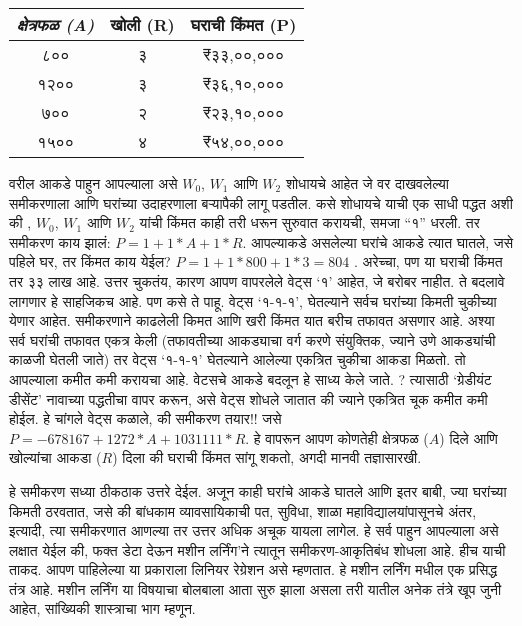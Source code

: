 \begin{table}[h!]
\centering
\begin{tabular}{|c|c|c|}
\hline
\textit{क्षेत्रफळ (A)} & \textbf{खोली (R)} & \textbf{घराची किंमत (P)} \\
\hline
८०० & ३ & ₹३३,००,००० \\
१२०० & ३ & ₹३६,१०,००० \\
७०० & २ & ₹२३,१०,००० \\
१५०० & ४ & ₹५४,००,००० \\
\hline
\end{tabular}
\end{table}


वरील आकडे पाहुन आपल्याला असे $W_0$, $W_1$ आणि $W_2$ शोधायचे आहेत जे वर दाखवलेल्या समीकरणाला आणि घरांच्या उदाहरणाला बऱ्यापैकी लागू पडतील. कसे शोधायचे याची एक साधी पद्धत अशी की , $W_0$, $W_1$ आणि $W_2$ यांची किंमत काही तरी धरून सुरुवात करायची, समजा ``१'' धरली. तर समीकरण काय झालं: $P = 1+ 1 *A + 1 *R$. आपल्याकडे असलेल्या घरांचे आकडे त्यात घातले, जसे पहिले घर, तर किंमत काय येईल? $P = 1+ 1 * 800 + 1*3 = 804$ . अरेच्चा, पण या घराची किंमत तर ३३ लाख आहे. उत्तर चुकतंय, कारण आपण वापरलेले वेट्स `१' आहेत, जे बरोबर नाहीत. ते बदलावे लागणार हे साहजिकच आहे. पण कसे ते पाहू. वेट्स `१-१-१', घेतल्याने सर्वच घरांच्या किमती चुकीच्या येणार आहेत. समीकरणाने काढलेली किमत आणि खरी किंमत यात बरीच तफावत असणार आहे. अश्या सर्व घरांची तफावत एकत्र केली (तफावतीच्या आकड्याचा वर्ग करणे संयुक्तिक, ज्याने उणे आकड्यांची काळजी घेतली जाते) तर वेट्स `१-१-१' घेतल्याने आलेल्या एकत्रित चुकीचा आकडा मिळतो. तो आपल्याला कमीत कमी करायचा आहे. वेटसचे आकडे बदलून हे साध्य केले जाते. ? त्यासाठी `ग्रेडीयंट डीसेंट' नावाच्या पद्धतीचा वापर करून, असे वेट्स शोधले जातात की ज्याने एकत्रित चूक कमीत कमी होईल. हे चांगले वेट्स कळाले, की समीकरण तयार!! जसे $P = -678167 + 1272 * A + 1031111 * R$. हे वापरून आपण कोणतेही क्षेत्रफळ ($A$) दिले आणि खोल्यांचा आकडा ($R$) दिला की  घराची किंमत सांगू शकतो, अगदी मानवी तज्ञासारखी.

हे समीकरण सध्या ठीकठाक उत्तरे देईल. अजून काही घरांचे आकडे  घातले  आणि इतर बाबी, ज्या घरांच्या किमती ठरवतात, जसे की बांधकाम व्यावसायिकाची पत, सुविधा, शाळा महाविद्यालयांपासूनचे अंतर, इत्यादी, त्या समीकरणात आणल्या तर उत्तर अधिक अचूक यायला लागेल. हे सर्व पाहुन आपल्याला असे लक्षात येईल की, फक्त डेटा देऊन मशीन लर्निंग'ने त्यातून समीकरण-आकृतिबंध शोधला आहे. हीच याची ताकद. आपण पाहिलेल्या या प्रकाराला लिनियर रेग्रेशन असे म्हणतात. हे मशीन लर्निंग मधील एक प्रसिद्ध तंत्र आहे. मशीन लर्निंग या विषयाचा बोलबाला आता सुरु झाला असला तरी यातील अनेक तंत्रे खूप जुनी आहेत, सांख्यिकी शास्त्राचा भाग म्हणून.

